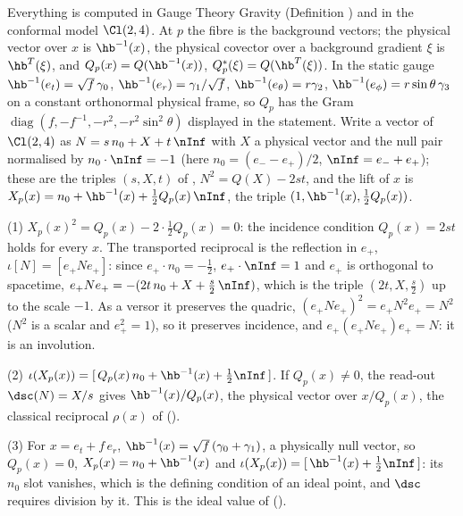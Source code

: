 Everything is computed in Gauge Theory Gravity (Definition ) and in the conformal model $\Cl(2,4)$. At $p$ the fibre is the background vectors; the physical vector over $x$ is $\hb^{-1}(x)$, the physical covector over a background gradient $\xi$ is $\hb^{T}(\xi)$, and $Q_p(x) = Q(\hb^{-1}(x))$, $Q^{*}_p(\xi) = Q(\hb^{T}(\xi))$. In the static gauge $\hb^{-1}(e_{t}) = \sqrt f\,\gamma_{0}$, $\hb^{-1}(e_{r}) = \gamma_{1}/\sqrt f$, $\hb^{-1}(e_{\theta}) = r\gamma_{2}$, $\hb^{-1}(e_{\phi}) = r\sin\theta\,\gamma_{3}$ on a constant orthonormal physical frame, so $Q_p$ has the Gram $\operatorname{diag}(f, -f^{-1}, -r^{2}, -r^{2}\sin^{2}\theta)$ displayed in the statement. Write a vector of $\Cl(2,4)$ as $N = s\,n_{0} + X + t\,\nInf$ with $X$ a physical vector and the null pair normalised by $n_{0}\cdot\nInf = -1$ (here $n_{0} = (e_{-} - e_{+})/2$, $\nInf = e_{-} + e_{+}$); these are the triples $(s, X, t)$ of , $N^{2} = Q(X) - 2st$, and the lift of $x$ is $X_p(x) = n_{0} + \hb^{-1}(x) + \tfrac12 Q_p(x)\,\nInf$, the triple $(1, \hb^{-1}(x), \tfrac12 Q_p(x))$.

(1) $X_p(x)^{2} = Q_p(x) - 2\cdot\tfrac12 Q_p(x) = 0$: the incidence condition $Q_p(x) = 2st$ holds for every $x$. The transported reciprocal is the reflection in $e_{+}$, $\iota[N] = [e_{+}Ne_{+}]$: since $e_{+}\cdot n_{0} = -\tfrac12$, $e_{+}\cdot\nInf = 1$ and $e_{+}$ is orthogonal to spacetime, $e_{+}Ne_{+} = -(2t\,n_{0} + X + \tfrac{s}{2}\,\nInf)$, which is the triple $(2t, X, \tfrac{s}{2})$ up to the scale $-1$. As a versor it preserves the quadric, $(e_{+}Ne_{+})^{2} = e_{+}N^{2}e_{+} = N^{2}$ ($N^{2}$ is a scalar and $e_{+}^{2} = 1$), so it preserves incidence, and $e_{+}(e_{+}Ne_{+})e_{+} = N$: it is an involution.

(2) $\iota(X_p(x)) = [\,Q_p(x)\,n_{0} + \hb^{-1}(x) + \tfrac12\nInf\,]$. If $Q_p(x) \neq 0$, the read-out $\dsc(N) = X/s$ gives $\hb^{-1}(x)/Q_p(x)$, the physical vector over $x/Q_p(x)$, the classical reciprocal $\rho(x)$ of \cite[Lem.~4.23(2)]{ButlerT1} ().

(3) For $x = e_{t} + f\,e_{r}$, $\hb^{-1}(x) = \sqrt f\,(\gamma_{0} + \gamma_{1})$, a physically null vector, so $Q_p(x) = 0$, $X_p(x) = n_{0} + \hb^{-1}(x)$ and $\iota(X_p(x)) = [\,\hb^{-1}(x) + \tfrac12\nInf\,]$: its $n_{0}$ slot vanishes, which is the defining condition of an ideal point, and $\dsc$ requires division by it. This is the ideal value of \cite[Thm.~4.10(3)]{ButlerT1} ().

